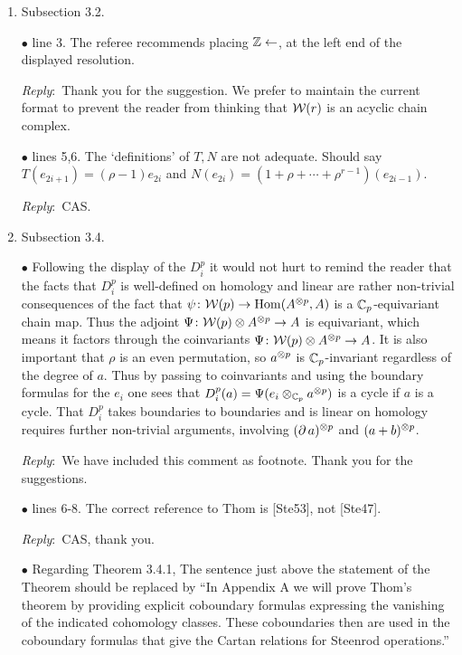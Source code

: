 \documentclass{amsart}
\newcommand{\ar}{\medskip\noindent\textit{Reply}:\ }
\def\subitem{\medskip\noindent$\bullet$ }
\begin{document}
\begin{enumerate}
	\item Subsection 3.2.

	\subitem line 3. The referee recommends placing $\mathbb{Z} \leftarrow$, at the left end of the displayed resolution.

	\ar Thank you for the suggestion.
	We prefer to maintain the current format to prevent the reader from thinking that $\mathcal{W}(r)$ is an acyclic chain complex.

	\subitem lines 5,6. The ‘definitions’ of $T, N$ are not adequate.
	Should say $T(e_{2i+1}) = (\rho-1)e_{2i}$ and $N(e_{2i}) = (1 + \rho + \cdots + \rho^{r-1})(e_{2i-1})$.

	\ar CAS.

	\item Subsection 3.4.

	\subitem Following the display of the $D_i^p$ it would not hurt to remind the reader that the facts that $D_i^p$ is well-defined on homology and linear are rather non-trivial consequences of the fact that $\psi \colon \mathcal{W}(p) \to \mathrm{Hom}(A^{\otimes p}, A)$ is a $\mathbb{C}_p$-equivariant chain map.
	Thus the adjoint $\Psi \colon \mathcal{W}(p) \otimes A^{\otimes p} \to A$ is equivariant, which means it factors through the coinvariants $\Psi \colon \mathcal{W}(p) \otimes A^{\otimes p} \to A$.
	It is also important that $\rho$ is an even permutation, so	$a^{\otimes p}$ is ${\mathbb{C}_p}$-invariant regardless of the degree of $a$.
	Thus by passing to coinvariants and using the boundary formulas for the $e_i$ one sees that $D_i^p(a) = \Psi(e_i \otimes_{\mathbb{C}_p} a^{\otimes p})$ is a cycle if $a$ is a cycle.
	That $D_i^p$ takes boundaries to boundaries and is linear on homology requires further non-trivial arguments, involving $(\operatorname{\partial} a)^{\otimes p}$ and $(a + b)^{\otimes p}$.

	\ar We have included this comment as footnote. Thank you for the suggestions.

	\subitem lines 6-8. The correct reference to Thom is [Ste53], not [Ste47].

	\ar CAS, thank you.

	\subitem Regarding Theorem 3.4.1, The sentence just above the statement of the Theorem should be
	replaced by “In Appendix A we will prove Thom’s theorem by providing explicit coboundary formulas expressing the vanishing of the indicated cohomology classes.
	These coboundaries then are used in the coboundary formulas that give the Cartan relations for Steenrod
	operations.”

	\medskip{}


\end{enumerate}
\end{document}
